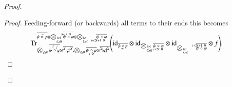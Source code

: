 \documentclass{amsart}
\def\tn{\textnormal}
\def\Trace{\tn{Tr}}
\def\ol{\overline}
\def\id{\tn{id}}
\newcommand{\feeddd}[3]{{\tensor*[^{#2}_{\color{white}{!}}]{{|#1|}}{^{#3}}}}%
\theoremstyle{remark}
\theoremstyle{definition}
\begin{document}
\begin{proof}
\begin{proof}
Feeding-forward (or backwards) all terms to their ends this becomes
 \begin{align*}
  \Trace^{\ol{\psi\;\accentset{\infty}{\circ}\;\varphi}\otimes\bigotimes_{\substack{\scriptscriptstyle i\ge1\\ \scriptscriptstyle k\ge0}}\ol{\psi\;\accentset{i+2k\ 0\ \ \ \,}{\circ}\;\varphi}\otimes\bigotimes_{\substack{\scriptscriptstyle i\ge1\\ \scriptscriptstyle k\ge0}}\quad\ol{\psi\;\underaccent{i+2k+1\ 0\ \ \ \ }{\circ}\;\varphi}}_{\bigotimes_{j\ge0}\ol{\psi\;\accentset{\,0\ j}{\circ}\;\varphi}\otimes\ol{\feeddd{\varphi}{X}{X}},\bigotimes_{i\ge0}\ol{\psi\;\underaccent{\,i\ 0}{\circ}\;\varphi}\otimes\ol{\feeddd{\varphi}{X}{X}}}
\Bigg(\id_{\ol{\psi\,\underaccent{\,\infty}{\circ}\,\varphi}}\otimes\id_{\bigotimes_{\substack{\scriptscriptstyle i\ge1\\ \scriptscriptstyle \ell\ge0}}\ol{\psi\;\underaccent{i+2\ell\ 0}{\circ}\;\varphi}}\otimes \id_{\bigotimes_{\substack{\scriptscriptstyle i\ge1\\ \scriptscriptstyle \ell\ge0}}\quad\ol{\psi\;\accentset{i+2\ell+1\ 0\ \ \ }{\circ}\;\varphi}}\otimes f\Bigg).
\end{align*}


\end{proof}
\end{proof}
\end{document}

